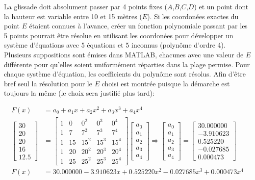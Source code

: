 La glissade doit absolument passer par 4 points fixes ($A$,$B$,$C$,$D$) et un
point dont la hauteur est variable entre 10 et 15 mètres ($E$). Si les
coordonées exactes du point $E$ étaient connues à l'avance, créer un fonction
polynomiale passant par les 5 points pourrait être résolue en utilisant les
coordonées pour développer un système d'équations avec 5 équations et 5 inconnus
(polynôme d'ordre 4). Plusieurs suppositions sont émises dans MATLAB, chacunes
avec une valeur de $E$ différente pour qu'elles soient uniformément réparties
dans la plage permise. Pour chaque système d'équation, les coefficients du
polynôme sont résolus. Afin d'être bref seul la résolution pour le $E$ choisi
est montrée puisque la démarche est toujours la même (le choix sera justifié
plus tard):

\begin{align}
	F(x) &= a_0 + a_1 x + a_2 x^2 + a_3 x^3 + a_4 x^4\\
\begin{bmatrix} 30\\ 20\\ 20\\ 16\\ 12.5 \end{bmatrix}
&=
\begin{bmatrix}
1 & 0 & 0^2 & 0^3 & 0^4\\
1 & 7 & 7^2 & 7^3 & 7^4\\
1 & 15 & 15^2 & 15^3 & 15^4\\
1 & 20 & 20^2 & 20^3 & 20^4\\
1 & 25 & 25^2 & 25^3 & 25^4
\end{bmatrix}
\begin{bmatrix} a_0\\ a_1\\ a_2\\ a_3\\ a_4 \end{bmatrix} \Rightarrow
\begin{bmatrix} a_0\\ a_1\\ a_2\\ a_3\\ a_4 \end{bmatrix} =
\begin{bmatrix} 30.000000\\ -3.910623\\ 0.525220\\ -0.027685\\ 0.000473
\end{bmatrix} \\
	F(x) &= 30.000000 -3.910623 x + 0.525220 x^2 -0.027685 x^3 + 0.000473 x^4
\end{align}

